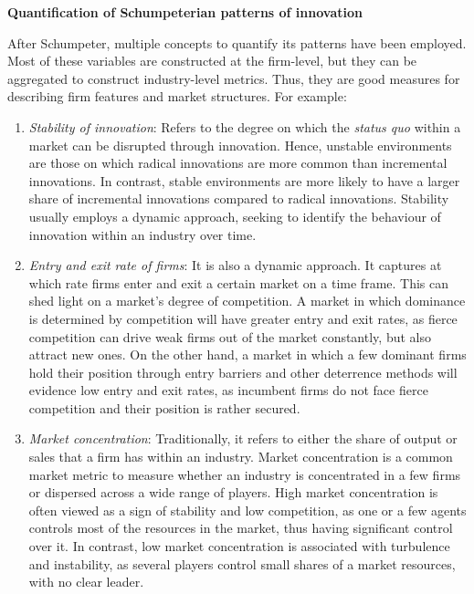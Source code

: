 \documentclass[12pt,a4paper]{article}
\begin{document}
\noindent \textbf{Quantification of Schumpeterian patterns of innovation}

After Schumpeter, multiple concepts to quantify its patterns have been employed. Most of these variables are constructed at the firm-level, but they can be aggregated to construct industry-level metrics. Thus, they are good measures for describing firm features and market structures. For example: 

\begin{enumerate}
	\item \textit{Stability of innovation}: Refers to the degree on which the \textit{status quo} within a market can be disrupted through innovation. Hence, unstable environments are those on which radical innovations are more common than incremental innovations. In contrast, stable environments are more likely to have a larger share of incremental innovations compared to radical innovations. Stability usually employs a dynamic approach, seeking to identify the behaviour of innovation within an industry over time. 
	
	\item \textit{Entry and exit rate of firms}: It is also a dynamic approach. It captures at which rate firms enter and exit a certain market on a time frame. This can shed light on a market’s degree of competition. A market in which dominance is determined by competition will have greater entry and exit rates, as fierce competition can drive weak firms out of the market constantly, but also attract new ones. On the other hand, a market in which a few dominant firms hold their position through entry barriers and other deterrence methods will evidence low entry and exit rates, as incumbent firms do not face fierce competition and their position is rather secured. 
	
	\item \textit{Market concentration}: Traditionally, it refers to either the share of output or sales that a firm has within an industry. Market concentration is a common market metric to measure whether an industry is concentrated in a few firms or dispersed across a wide range of players. High market concentration is often viewed as a sign of stability and low competition, as one or a few agents controls most of the resources in the market, thus having significant control over it. In contrast, low market concentration is associated with turbulence and instability, as several players control small shares of a market resources, with no clear leader.  
	

\end{enumerate}
\end{document}
